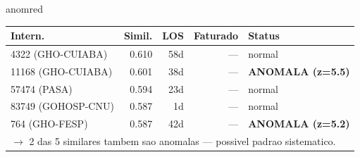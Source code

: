 \documentclass[a4paper,10pt]{article}
\begin{document}
\begin{anomalycard}[Internacao 142202 | GHO-PETROBRAS | CRITICO (z=5.11)]{anomred}
\begin{tabular}{l r r r l}\toprule\textbf{Intern.} & \textbf{Simil.} & \textbf{LOS} & \textbf{Faturado} & \textbf{Status} \\\midrule
4322 (GHO-CUIABA) & 0.610 & 58d & --- & \textcolor{jcubeblue}{normal} \\
11168 (GHO-CUIABA) & 0.601 & 38d & --- & \textcolor{anomred}{\textbf{ANOMALA (z=5.5)}} \\
57474 (PASA) & 0.594 & 23d & --- & \textcolor{jcubeblue}{normal} \\
83749 (GOHOSP-CNU) & 0.587 & 1d & --- & \textcolor{jcubeblue}{normal} \\
764 (GHO-FESP) & 0.587 & 42d & --- & \textcolor{anomred}{\textbf{ANOMALA (z=5.2)}} \\
\multicolumn{5}{l}{\textcolor{anomred}{\small $\rightarrow$ 2 das 5 similares tambem sao anomalas --- possivel padrao sistematico.}} \\
\bottomrule\end{tabular}



\end{anomalycard}

\newpage
\end{document}
